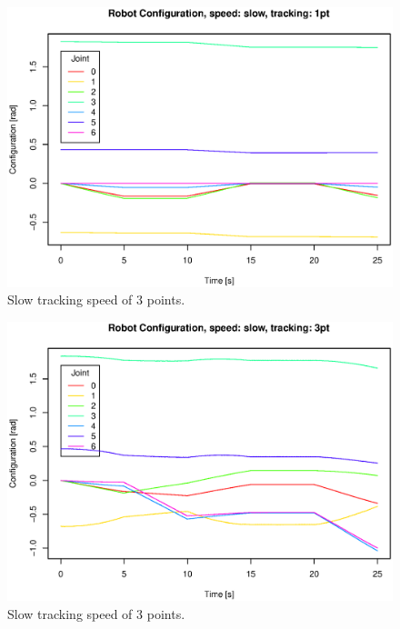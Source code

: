\begin{figure}[H]
\centering
\includegraphics[width= \fullImageWidth]{graphics/robotics/robotConfiguration_slow_1pt}
\caption{Slow tracking speed of 3 points.}
\label{fig:robotic_conf_slow_1pt}
\end{figure}

\begin{figure}[H]
\centering
\includegraphics[width= \fullImageWidth]{graphics/robotics/robotConfiguration_slow_3pt}
\caption{Slow tracking speed of 3 points.}
\label{fig:robotic_conf_slow_3pt}
\end{figure}

